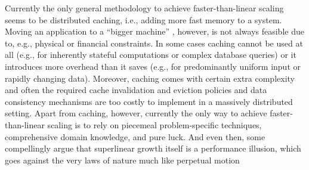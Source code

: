 Currently the only general methodology to achieve faster-than-linear scaling seems to be distributed caching, i.e., adding more fast memory to a system. Moving an application to a ``bigger machine'' \cite{dobb-2}, however, is not always feasible due to, e.g., physical or financial constraints.  In some cases caching cannot be used at all (e.g., for inherently stateful computations or complex database queries) or it introduces more overhead than it saves (e.g., for predominantly uniform input or rapidly changing data).  Moreover, caching comes with certain extra complexity \cite{271208} and often the required cache invalidation and eviction policies and data consistency mechanisms are too costly to implement in a massively distributed setting. Apart from caching, however, currently the only way to achieve faster-than-linear scaling is to rely on piecemeal problem-specific techniques, comprehensive domain knowledge, and pure luck. And even then, some compellingly argue that superlinear growth itself is a performance illusion, which goes against the very laws of nature much like perpetual motion \cite{gunther-hotsos, 10.1145/2773212.2789974}



